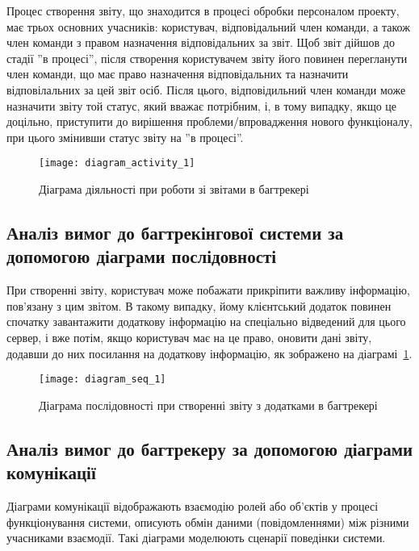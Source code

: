 \documentclass[../main.tex]{subfiles}
\begin{document}
	Процес створення звіту, що знаходится в процесі обробки персоналом проекту, має трьох основних учасників: користувач, відповідальний член команди, а також член команди з правом назначення відповідальних за звіт. Щоб звіт дійшов до стадії ''в процесі'', після створення користувачем звіту його повинен перегланути член команди, що має право назначення відповідальних та назначити відповілальних за цей звіт осіб. Після цього, відповідильний член команди може назначити звіту той статус, який вважає потрібним, і, в тому випадку, якщо це доцільно, приступити до вирішення проблеми/впровадження нового функціоналу, при цього змінивши статус звіту на ''в процесі''.
	
	\begin{figure}[H]
	\centering
	\texttt{[image: diagram\_activity\_1]}
	\caption{Діаграма діяльності при роботи зі звітами в багтрекері}
	\end{figure}
	
	\subsection{Аналіз вимог до багтрекінгової системи за допомогою діаграми послідовності}
	
	При створенні звіту, користувач може побажати прикріпити важливу інформацію, пов'язану з цим звітом. В такому випадку, йому клієнтський додаток повинен спочатку завантажити додаткову інформацію на спеціально відведений для цього сервер, і вже потім, якщо користувач має на це право, оновити дані звіту, додавши до них посилання на додаткову інформацію, як зображено на діаграмі~\ref{figure_diag_seq_1}.
	
	\begin{figure}[H]
		\centering
		\texttt{[image: diagram\_seq\_1]}
		\caption{Діаграма послідовності при створенні звіту з додатками в багтрекері}
		\label{figure_diag_seq_1}
	\end{figure}
	
	\subsection{Аналіз вимог до багтрекеру за допомогою діаграми комунікації}
	
	Діаграми комунікації відображають взаємодію ролей або об'єктів у процесі функціонування системи, описують обмін даними (повідомленнями) між різними учасниками взаємодії. Такі діаграми моделюють сценарії поведінки системи.~\cite{chnu_designing_systems}
	
\end{document}

